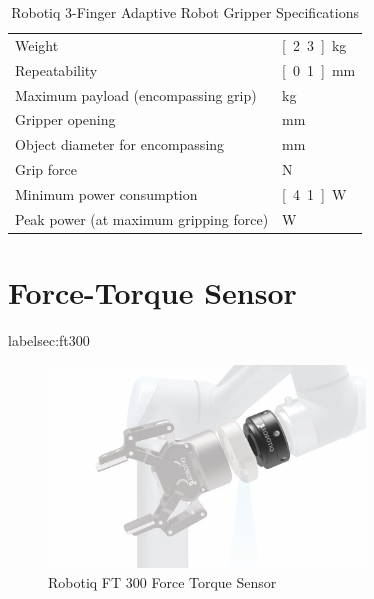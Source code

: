 \begin{table}[h]
\begin{center}
 \caption{Robotiq 3-Finger Adaptive Robot Gripper Specifications}\vspace{1ex}
 \label{tab:robotiq_gripper}
 \begin{tabular}{ll}
 \hline
 Weight & \unit[2.3]{kg}\\
 Repeatability & \unit[0.1]{mm} \\
 Maximum payload (encompassing grip) & \unit[10]{kg}\\
 Gripper opening & \unit[0 to 155]{mm} \\
 Object diameter for encompassing & \unit[20 to 155]{mm}\\
 Grip force & \unit[30 to 70]{N} \\
 Minimum power consumption & \unit[4.1]{W} \\
 Peak power (at maximum gripping force) & \unit[36]{W}\\
 \hline
 \end{tabular}
\end{center}
\end{table}

\section{Force-Torque Sensor}
	label{sec:ft300}

\begin{figure}
   \centering
   \includegraphics[width=0.75\textwidth]{images/robotiq_ft.jpg}
   \caption{Robotiq FT 300 Force Torque Sensor}
   \label{pics:robotiq_ft}
\end{figure}

